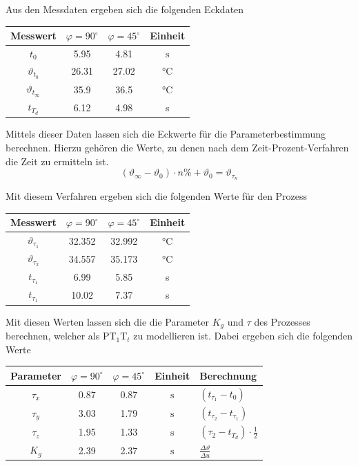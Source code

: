 Aus den Messdaten ergeben sich die folgenden Eckdaten
\begin{table}[h!]
	\centering
	\begin{tabular}{c c c c}
		Messwert
			& $\varphi = 90^\circ$
			& $\varphi = 45^\circ$
			& Einheit \\
		\hline
		$t_0$
			& 5.95
			& 4.81
			& $\si{\second}$ \\
		$\vartheta_{t_0}$
			& 26.31
			& 27.02
			& \si{\celsius} \\
		$\vartheta_{t_\infty}$
			& 35.9
			& 36.5
			& \si{\celsius} \\
		$t_{T_d}$
			& 6.12
			& 4.98
			& \si{\second} \\
	\end{tabular}
\end{table}

Mittels dieser Daten lassen sich die Eckwerte für die Parameterbestimmung
berechnen. Hierzu gehören die Werte, zu denen nach dem Zeit-Prozent-Verfahren
die Zeit zu ermitteln ist.
\[
	(\vartheta_\infty - \vartheta_0) \cdot n \% + \vartheta_0
	= \vartheta_{\tau_n}
\]

Mit diesem Verfahren ergeben sich die folgenden Werte für den Prozess
\begin{table}[h!]
	\centering
	\begin{tabular}{c c c c}
		Messwert
			& $\varphi = 90^\circ$
			& $\varphi = 45^\circ$
			& Einheit \\
		\hline
		$\vartheta_{\tau_1}$
			& 32.352
			& 32.992
			& $\si{\celsius}$ \\
		$\vartheta_{\tau_2}$
			& 34.557
			& 35.173
			& \si{\celsius} \\
		$t_{\tau_1}$
			& 6.99
			& 5.85
			& \si{\second} \\
		$t_{\tau_1}$
			& 10.02
			& 7.37
			& \si{\second} \\
	\end{tabular}
\end{table}

Mit diesen Werten lassen sich die die Parameter $K_g$ und $\tau$ des Prozesses
berechnen, welcher als PT$_1$T$_t$ zu modellieren ist. Dabei ergeben sich die
folgenden Werte
\begin{table}[h!]
	\centering
	\begin{tabular}{c c c c | l}
		Parameter
			& $\varphi = 90^\circ$
			& $\varphi = 45^\circ$
			& Einheit
			& Berechnung \\
		\hline
		$\tau_x$
			& 0.87
			& 0.87
			& $\si{\second}$
			& $(t_{\tau_1} - t_0)$ \\
		$\tau_y$
			& 3.03
			& 1.79
			& $\si{\second}$
			& $(t_{\tau_2} - t_{\tau_1})$ \\
		$\tau_z$
			& 1.95
			& 1.33
			& $\si{\second}$
			& $(\tau_2 - t_{T_d}) \cdot \frac{1}{2}$ \\
		$K_g$
			& 2.39
			& 2.37
			& $\si{\second}$
			& $\frac{\Delta \vartheta}{\Delta u}$
	\end{tabular}
\end{table}

